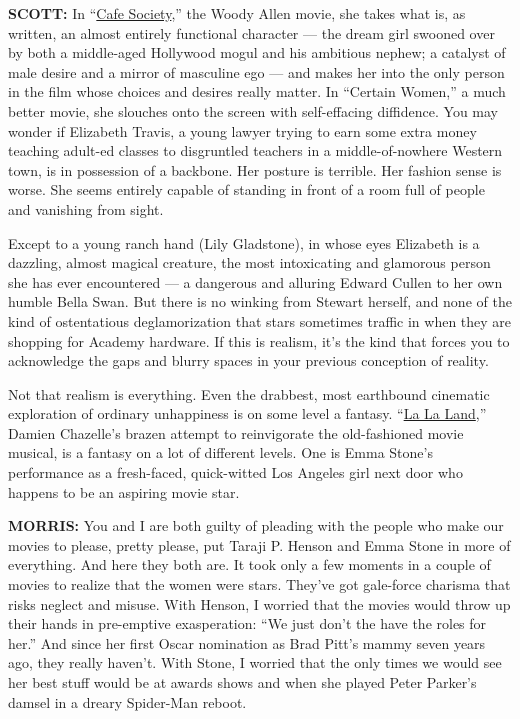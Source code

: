 \textbf{SCOTT:} In
``\href{https://www.nytimes3xbfgragh.onion/2016/07/15/movies/cafe-society-review-woody-allen.html}{Cafe
Society},'' the Woody Allen movie, she takes what is, as written, an
almost entirely functional character --- the dream girl swooned over by
both a middle-aged Hollywood mogul and his ambitious nephew; a catalyst
of male desire and a mirror of masculine ego --- and makes her into the
only person in the film whose choices and desires really matter. In
``Certain Women,'' a much better movie, she slouches onto the screen
with self-effacing diffidence. You may wonder if Elizabeth Travis, a
young lawyer trying to earn some extra money teaching adult-ed classes
to disgruntled teachers in a middle-of-nowhere Western town, is in
possession of a backbone. Her posture is terrible. Her fashion sense is
worse. She seems entirely capable of standing in front of a room full of
people and vanishing from sight.

Except to a young ranch hand (Lily Gladstone), in whose eyes Elizabeth
is a dazzling, almost magical creature, the most intoxicating and
glamorous person she has ever encountered --- a dangerous and alluring
Edward Cullen to her own humble Bella Swan. But there is no winking from
Stewart herself, and none of the kind of ostentatious deglamorization
that stars sometimes traffic in when they are shopping for Academy
hardware. If this is realism, it's the kind that forces you to
acknowledge the gaps and blurry spaces in your previous conception of
reality.

Not that realism is everything. Even the drabbest, most earthbound
cinematic exploration of ordinary unhappiness is on some level a
fantasy.
``\href{https://www.nytimes3xbfgragh.onion/2016/11/06/movies/la-la-land-stars-ryan-gosling-emma-stone-and-los-angeles.html}{La
La Land},'' Damien Chazelle's brazen attempt to reinvigorate the
old-fashioned movie musical, is a fantasy on a lot of different levels.
One is Emma Stone's performance as a fresh-faced, quick-witted Los
Angeles girl next door who happens to be an aspiring movie star.

\textbf{MORRIS:} You and I are both guilty of pleading with the people
who make our movies to please, pretty please, put Taraji P. Henson and
Emma Stone in more of everything. And here they both are. It took only a
few moments in a couple of movies to realize that the women were stars.
They've got gale-force charisma that risks neglect and misuse. With
Henson, I worried that the movies would throw up their hands in
pre-emptive exasperation: ``We just don't the have the roles for her.''
And since her first Oscar nomination as Brad Pitt's mammy seven years
ago, they really haven't. With Stone, I worried that the only times we
would see her best stuff would be at awards shows and when she played
Peter Parker's damsel in a dreary Spider-Man reboot.

